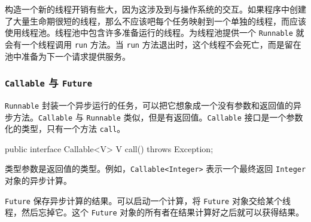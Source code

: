构造一个新的线程开销有些大，因为这涉及到与操作系统的交互。如果程序中创建了大量生命期很短的线程，那么不应该吧每个任务映射到一个单独的线程，而应该使用线程池。线程池中包含许多准备运行的线程。为线程池提供一个 \texttt{Runnable} 就会有一个线程调用 \texttt{run} 方法。当 \texttt{run} 方法退出时，这个线程不会死亡，而是留在池中准备为下一个请求提供服务。

\subsubsection{\texttt{Callable} 与 \texttt{Future}}

\texttt{Runnable} 封装一个异步运行的任务，可以把它想象成一个没有参数和返回值的异步方法。\texttt{Callable} 与 \texttt{Runnable} 类似，但是有返回值。\texttt{Callable} 接口是一个参数化的类型，只有一个方法 \texttt{call}。

\begin{Java}
public interface Callable<V> {
    V call() throws Exception;
}
\end{Java}

类型参数是返回值的类型。例如，\texttt{Callable<Integer>} 表示一个最终返回 \texttt{Integer} 对象的异步计算。

\texttt{Future} 保存异步计算的结果。可以启动一个计算，将 \texttt{Future} 对象交给某个线程，然后忘掉它。这个 \texttt{Future} 对象的所有者在结果计算好之后就可以获得结果。


